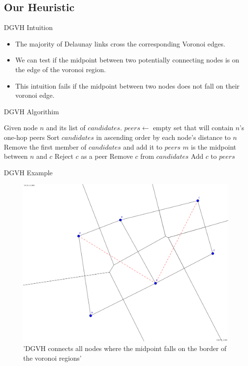 \documentclass[8pt]{beamer}
\begin{document}
	\subsection{Our Heuristic}

	\begin{frame}{DGVH Intuition}

		\begin{itemize}
			\item The majority of Delaunay links cross the corresponding Voronoi edges.
			\item We can test if the midpoint between two potentially connecting nodes is on the edge of the voronoi region.
			\item This intuition fails if the midpoint between two nodes does not fall on their voronoi edge.
		\end{itemize}

	\end{frame}
	
	
	\begin{frame}{DGVH Algorithim}

			\begin{algorithmic}[1]  %
				\STATE Given node $n$ and its list of $candidates$.
				\STATE $peers \leftarrow$ empty set that will contain $n$'s one-hop peers
				\STATE Sort $candidates$ in ascending order by each node's distance to $n$
				\STATE Remove the first member of $candidates$ and add it to $peers$
				\STATE $m$ is the midpoint between $n$ and $c$
				\STATE Reject $c$ as a peer
				\ELSE
				\STATE Remove $c$ from $candidates$
				\STATE Add $c$ to $peers$
				\ENDIF
				\ENDFOR
			\end{algorithmic}

	\end{frame}
	
	
	
\begin{frame}{DGVH Example}
	\begin{figure}
	\centering
	\includegraphics[width=0.5\linewidth]{DGVH}
	\caption{'DGVH connects all nodes where the midpoint falls on the border of the voronoi regions'}
	\label{delaunay}
\end{figure}
	\end{frame}
	
\end{document}
